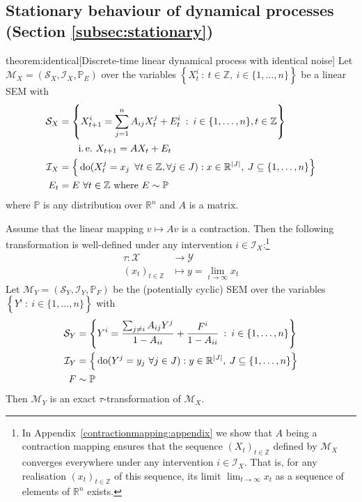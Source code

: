 \subsection{Stationary behaviour of dynamical processes (Section \ref{subsec:stationary})}\label{subsec:causality-appendix-dynamical-proof}


\begin{reptheorem}{theorem:identical}[Discrete-time linear dynamical process with identical noise]
Let $\mathcal{M}_X = \left(\mathcal{S}_X, \mathcal{I}_X, \mathbb{P}_{E} \right)$ over the variables ${\left\lbrace X_t^i \: : \: t \in \mathbb{Z}, \: i\in \{1,\ldots,n\} \right\rbrace}$ be a linear SEM with
%
\begin{align*}
\mathcal{S}_X &= \left\lbrace X_{t+1}^i = \sum_{j=1}^n A_{ij}X_t^j + E_t^i \:  : \: i \in \{1,\ldots,n\}, t\in\mathbb{Z} \right\rbrace \\
&\qquad\text{i.\,e.}\ X_{t+1} = AX_t + E_t \\
%
\mathcal{I}_X &= \Big{\{} \doop(X_t^j= x_j \enspace \forall t \in \mathbb{Z},\forall j \in J):  x \in \mathbb{R}^{|J|}, \: J \subseteq \{1,\ldots,n\} \Big{\}} \\
%
E_t &= E\ \forall t\in\mathbb{Z} \text{ where } E \sim \mathbb{P}
\end{align*}
%
where $\mathbb{P}$ is any distribution over $\mathbb{R}^n$ and $A$ is a matrix.

Assume that the linear mapping $v\mapsto Av$ is a contraction.
Then the following transformation is well-defined under any intervention $i\in\mathcal{I}_X$:\footnote{In Appendix~\ref{contractionmapping:appendix} we show that $A$ being a contraction mapping ensures that the sequence $(X_t)_{t\in\mathbb{Z}}$ defined by $\mathcal{M}_X$ converges everywhere under any intervention $i\in\mathcal{I}_X$. That is, for any realisation $(x_t)_{t\in\mathbb{Z}}$ of this sequence, its limit $\lim_{t\rightarrow \infty}x_t$ as a sequence of elements of $\mathbb{R}^n$ exists.}
%
\begin{align*}
\tau : \mathcal{X} &\rightarrow \mathcal{Y} \\
(x_t)_{t\in \mathbb{Z}} & \mapsto y= \lim_{t\rightarrow \infty} x_t
\end{align*}
%
Let ${\mathcal{M}_Y = \left(\mathcal{S}_Y, \mathcal{I}_Y, \mathbb{P}_{F} \right)}$ be the (potentially cyclic) SEM over the variables ${\left\lbrace Y^i \: :  \: i\in \{1,\ldots,n\} \right\rbrace}$  with
%
\begin{align*}
\mathcal{S}_Y &= \left\lbrace Y^i = \frac{\sum_{j\not=i} A_{ij}Y^j}{1-A_{ii}} + \frac{F^i}{1-A_{ii}} \:  : \: i \in \{1,\ldots,n\} \right\rbrace \\
%
\mathcal{I}_Y &= \Big{\{} \doop(Y^j= y_j \ \forall j \in J) : y \in \mathbb{R}^{|J|}, \: J \subseteq \{1,\ldots,n\} \Big{\}} \\
%
F &\sim \mathbb{P}
\end{align*}
%
Then $\mathcal{M}_Y$ is an exact $\tau$-transformation of $\mathcal{M}_X$.
\end{reptheorem}

